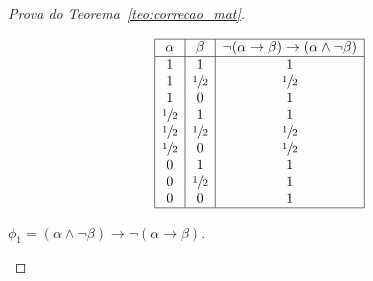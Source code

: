 \begin{proof}[Prova do Teorema~\ref{teo:correcao_mat}]
\begin{provaporcasos}
\begin{provaporsubcasos}
                    \begin{center}
                        \[
                            \begin{array}{|c|c|c|}%
                                \hline%
                                \alpha      & \beta & \neg (\alpha \to \beta) \to(\alpha \land \neg \beta) \\
                                \hline%
                                1 & 1 & 1\\
                                1 & \meio{} & \meio{}\\
                                1 & 0 & 1\\
                                \meio{} & 1 & 1\\
                                \meio{} & \meio{} &\meio{}\\ 
                                \meio{} & 0 & \meio{}\\
                                0 & 1 & 1\\
                                0 & \meio{} & 1\\
                                0 & 0 & 1\\
                                \hline%
                            \end{array}
                        \]
                    \end{center}
                

                    \subcasodeprova{} $\phi_{1} = (\alpha \land \neg \beta) \to \neg(\alpha \to \beta)$.


\end{provaporsubcasos}
\end{provaporcasos}
\end{proof}
